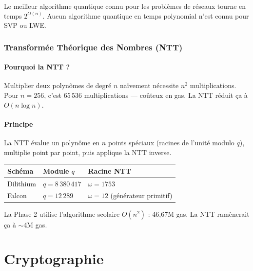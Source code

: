 \documentclass[11pt,a4paper]{article}
\begin{document}
\begin{resultbox}
Le meilleur algorithme quantique connu pour les problèmes de réseaux tourne en temps $2^{O(n)}$. Aucun algorithme quantique en temps polynomial n'est connu pour SVP ou LWE.
\end{resultbox}

\section{Transformée Théorique des Nombres (NTT)}

\subsection{Pourquoi la NTT ?}

Multiplier deux polynômes de degré $n$ naïvement nécessite $n^2$ multiplications. Pour $n=256$, c'est $65\,536$ multiplications --- coûteux en gas. La NTT réduit ça à $O(n \log n)$.

\subsection{Principe}

La NTT évalue un polynôme en $n$ points spéciaux (racines de l'unité modulo $q$), multiplie point par point, puis applique la NTT inverse.

\begin{center}
\begin{tabular}{lll}
\toprule
\textbf{Schéma} & \textbf{Module $q$} & \textbf{Racine NTT} \\
\midrule
Dilithium & $q = 8\,380\,417$ & $\omega = 1753$ \\
Falcon    & $q = 12\,289$     & $\omega = 12$ (générateur primitif) \\
\bottomrule
\end{tabular}
\end{center}

\begin{warningbox}
La Phase 2 utilise l'algorithme scolaire $O(n^2)$ : 46,67M gas. La NTT ramènerait ça à $\sim$4M gas.
\end{warningbox}

\newpage
\part{Cryptographie}
\end{document}
